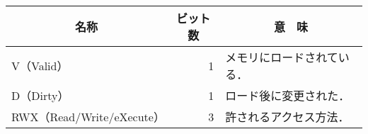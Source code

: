\documentclass{standalone}
\begin{document}
\begin{tabular}{l|r|l}
\hline\hline
\multicolumn{1}{c}{名称} &
 \multicolumn{1}{|c}{ビット数} &
 \multicolumn{1}{|c}{意　味} \\
\hline
V（Valid）                 & 1 & メモリにロードされている． \\
D（Dirty）                 & 1 & ロード後に変更された． \\
RWX（Read/Write/eXecute）  & 3 & 許されるアクセス方法． \\
\end{tabular}
\end{document}
